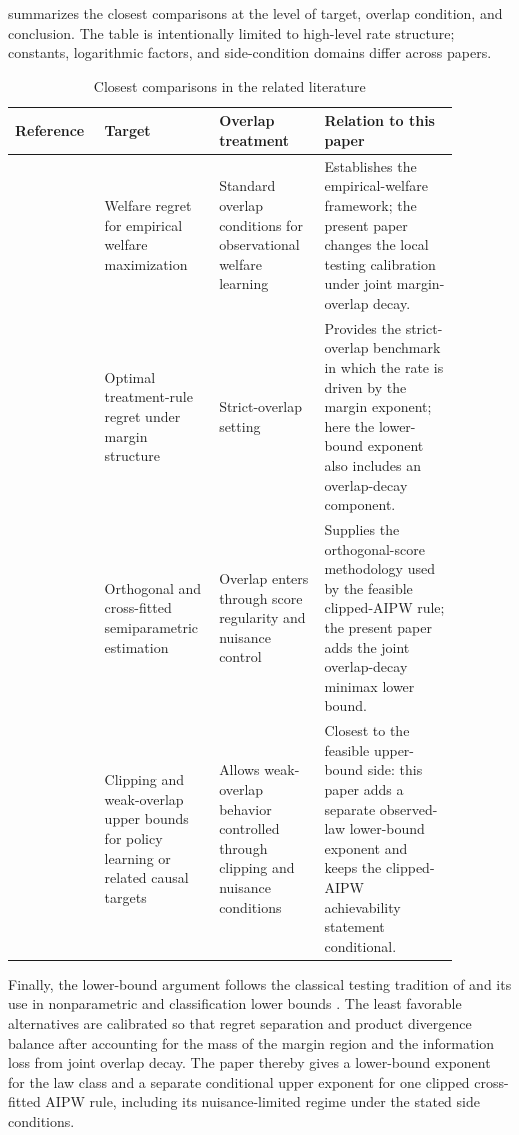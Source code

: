 \documentclass[11pt]{article}
\begin{document}
 summarizes the closest comparisons at the level of target, overlap condition, and conclusion.  The table is intentionally limited to high-level rate structure; constants, logarithmic factors, and side-condition domains differ across papers.

\begin{table}[t]
\centering
\caption{Closest comparisons in the related literature}
\label{tab:related-comparison}
\begin{tabular}{p{0.18\linewidth}p{0.20\linewidth}p{0.22\linewidth}p{0.28\linewidth}}
\hline
Reference & Target & Overlap treatment & Relation to this paper \\
\hline
\citet{Kitagawa2018} & Welfare regret for empirical welfare maximization & Standard overlap conditions for observational welfare learning & Establishes the empirical-welfare framework; the present paper changes the local testing calibration under joint margin-overlap decay. \\
\citet{Luedtke2017} & Optimal treatment-rule regret under margin structure & Strict-overlap setting & Provides the strict-overlap benchmark in which the rate is driven by the margin exponent; here the lower-bound exponent also includes an overlap-decay component. \\
\citet{Chernozhukov2018,Chernozhukov2022} & Orthogonal and cross-fitted semiparametric estimation & Overlap enters through score regularity and nuisance control & Supplies the orthogonal-score methodology used by the feasible clipped-AIPW rule; the present paper adds the joint overlap-decay minimax lower bound. \\
\citet{Liu2026} & Clipping and weak-overlap upper bounds for policy learning or related causal targets & Allows weak-overlap behavior controlled through clipping and nuisance conditions & Closest to the feasible upper-bound side: this paper adds a separate observed-law lower-bound exponent and keeps the clipped-AIPW achievability statement conditional. \\
\hline
\end{tabular}
\end{table}

Finally, the lower-bound argument follows the classical testing tradition of \citet{LeCam1986} and its use in nonparametric and classification lower bounds \citep{Tsybakov2009}.  The least favorable alternatives are calibrated so that regret separation and product divergence balance after accounting for the mass of the margin region and the information loss from joint overlap decay.  The paper thereby gives a lower-bound exponent for the law class and a separate conditional upper exponent for one clipped cross-fitted AIPW rule, including its nuisance-limited regime under the stated side conditions.
\end{document}
